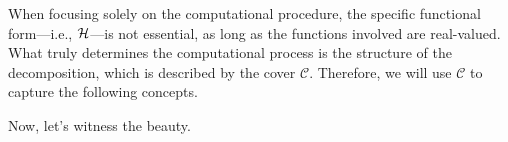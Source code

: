 \documentclass[letterpaper,11pt]{article}
\newcommand{\samplespace}{\bbX}
\newcommand{\takesetp}[1]{\mathrm{set}[#1]}
\newcommand{\cover}{\mathcal{C}}
\begin{document}
     
\begin{remark}
    When focusing solely on the computational procedure, the specific functional form—i.e., ${\mathcal{H}}$—is not essential, as long as the functions involved are real-valued. What truly determines the computational process is the structure of the decomposition, which is described by the cover $\cover$. Therefore, we will use $\cover$ to capture the following concepts.
\end{remark}

Now, let's witness the beauty.
\end{document}
